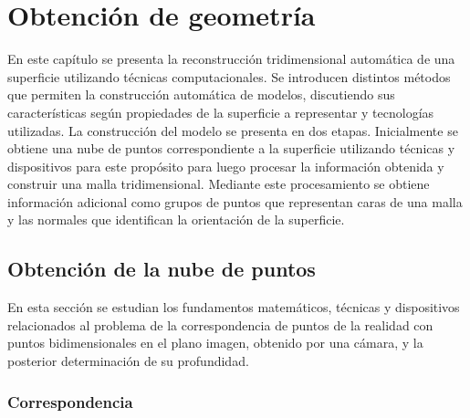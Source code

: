 \chapter{Obtención de geometría}

En este capítulo se presenta la reconstrucción tridimensional automática de una superficie utilizando técnicas computacionales.
Se introducen distintos métodos que permiten la construcción automática de modelos, discutiendo sus características según propiedades de la superficie a representar y tecnologías utilizadas.
La construcción del modelo se presenta en dos etapas. Inicialmente se obtiene una nube de puntos correspondiente a la superficie utilizando técnicas y dispositivos para este propósito para luego procesar la información obtenida y construir una malla tridimensional. Mediante este procesamiento se obtiene información adicional como grupos de puntos que representan caras de una malla y las normales que identifican la orientación de la superficie. 

\section{Obtención de la nube de puntos}

En esta sección se estudian los fundamentos matemáticos, técnicas y dispositivos relacionados al problema de la correspondencia de puntos de la realidad con puntos bidimensionales en el plano imagen, obtenido por una cámara, y la posterior determinación de su profundidad. 

\subsection{Correspondencia}



